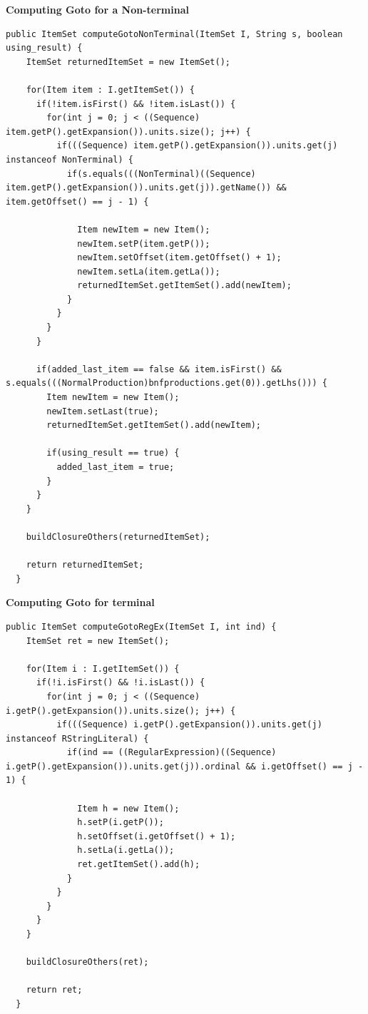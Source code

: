 \documentclass[oneside]{book}
\begin{document}
\textbf{Computing Goto for a Non-terminal}
\begin{lstlisting}
public ItemSet computeGotoNonTerminal(ItemSet I, String s, boolean using_result) {
    ItemSet returnedItemSet = new ItemSet();
    
    for(Item item : I.getItemSet()) {
      if(!item.isFirst() && !item.isLast()) {
        for(int j = 0; j < ((Sequence) item.getP().getExpansion()).units.size(); j++) {
          if(((Sequence) item.getP().getExpansion()).units.get(j) instanceof NonTerminal) {
            if(s.equals(((NonTerminal)((Sequence) item.getP().getExpansion()).units.get(j)).getName()) && item.getOffset() == j - 1) {
              
              Item newItem = new Item();
              newItem.setP(item.getP());
              newItem.setOffset(item.getOffset() + 1);
              newItem.setLa(item.getLa());
              returnedItemSet.getItemSet().add(newItem);
            }
          }
        }
      }
      
      if(added_last_item == false && item.isFirst() && s.equals(((NormalProduction)bnfproductions.get(0)).getLhs())) {
        Item newItem = new Item();
        newItem.setLast(true);
        returnedItemSet.getItemSet().add(newItem);
        
        if(using_result == true) {
          added_last_item = true;
        }
      }
    }
    
    buildClosureOthers(returnedItemSet);
    
    return returnedItemSet;
  }
\end{lstlisting}
\textbf{Computing Goto for terminal}
\begin{lstlisting}
public ItemSet computeGotoRegEx(ItemSet I, int ind) {
    ItemSet ret = new ItemSet();
    
    for(Item i : I.getItemSet()) {
      if(!i.isFirst() && !i.isLast()) {
        for(int j = 0; j < ((Sequence) i.getP().getExpansion()).units.size(); j++) {
          if(((Sequence) i.getP().getExpansion()).units.get(j) instanceof RStringLiteral) {
            if(ind == ((RegularExpression)((Sequence) i.getP().getExpansion()).units.get(j)).ordinal && i.getOffset() == j - 1) {
            
              Item h = new Item();
              h.setP(i.getP());
              h.setOffset(i.getOffset() + 1);
              h.setLa(i.getLa());
              ret.getItemSet().add(h);
            }
          }
        }
      }
    }
    
    buildClosureOthers(ret);
    
    return ret;
  }
\end{lstlisting}
\end{document}
